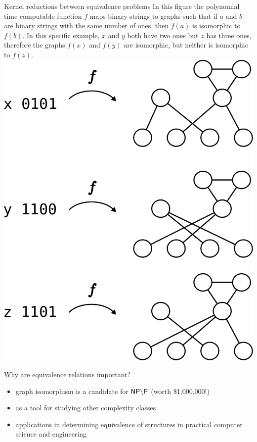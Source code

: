 \documentclass[final]{beamer}
\begin{document}
\begin{frame}{}
\begin{columns}[t]
\begin{column}{.3\linewidth}
      \begin{block}{\LARGE Kernel reductions between equivalence problems}
        \Large In this figure the polynomial time computable function $f$ maps
        binary strings to graphs such that if $a$ and $b$ are binary strings
        with the same number of ones, then $f(a)$ is isomorphic to $f(b)$. In
        this specific example, $x$ and $y$ both have two ones but $z$ has three
        ones, therefore the graphs $f(x)$ and $f(y)$ are isomorphic, but
        neither is isomorphic to $f(z)$.
        \includegraphics{images/rbc_gi.png}
      \end{block}

      \vspace{0.2in}

      \begin{block}{\LARGE Why are equivalence relations important?}
        \begin{itemize}
          \Large
        \item graph isomorphism is a candidate for ${\mathsf{NP}}\backslash{\ensuremath{\mathsf{P}}}$ (worth
          \$1,000,000!)
        \item as a tool for studying other complexity classes
        \item applications in determining equivalence of structures in
          practical computer science and engineering
        \end{itemize}
      \end{block}


\end{column}
\end{columns}
\end{frame}
\end{document}
